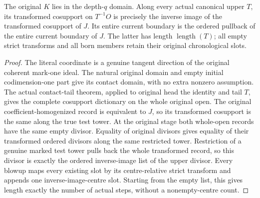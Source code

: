 \begin{lemma}
\label{hir:disjoint-canonical-normal-contact-dictionary}
\leanok
The original $K$ lies in the depth-$q$ domain. Along every actual canonical
upper $T$, its transformed cosupport on $T^{-1}O$ is precisely the inverse
image of the transformed cosupport of $J$. Its entire current boundary is
the ordered pullback of the entire current boundary of $J$. The latter has
length $\operatorname{length}(T)$; all empty strict transforms and all born
members retain their original chronological slots.
\end{lemma}
\begin{proof}
The literal coordinate is a genuine tangent direction of the original
coherent mark-one ideal. The natural original domain and empty initial
codimension-one part give its contact domain, with no extra nonzero
assumption. The actual contact-tail theorem, applied to original head the
identity and tail $T$, gives the complete cosupport dictionary on the whole
original open. The original coefficient-homogenized record is equivalent
to $J$, so its transformed cosupport is the same along the true test tower.
At the original stage both whole-open records have the same empty divisor.
Equality of original divisors gives equality of their transformed ordered
divisors along the same restricted tower. Restriction of a genuine marked
test tower pulls back the whole transformed record, so this divisor is
exactly the ordered inverse-image list of the upper divisor. Every blowup
maps every existing slot by its centre-relative strict transform and appends
one inverse-image-centre slot. Starting from the empty list, this gives
length exactly the number of actual steps, without a nonempty-centre count.
\end{proof}


